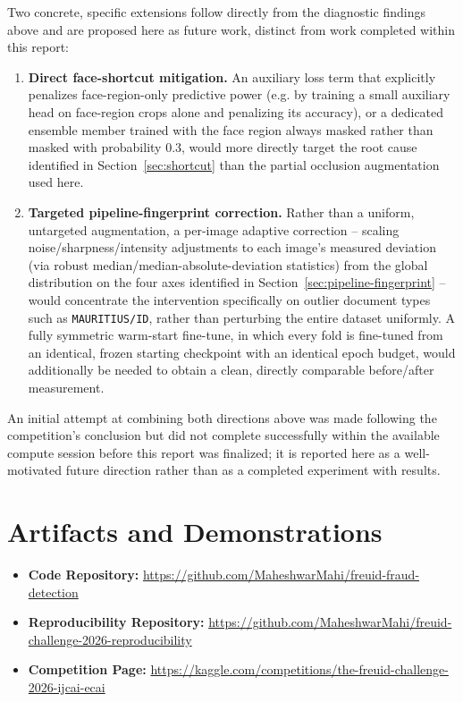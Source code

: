 \documentclass{article}
\begin{document}
Two concrete, specific extensions follow directly from the diagnostic
findings above and are proposed here as future work, distinct from work
completed within this report:
\begin{enumerate}[noitemsep]
    \item \textbf{Direct face-shortcut mitigation.} An auxiliary loss term
    that explicitly penalizes face-region-only predictive power (e.g. by
    training a small auxiliary head on face-region crops alone and
    penalizing its accuracy), or a dedicated ensemble member trained with
    the face region always masked rather than masked with probability 0.3,
    would more directly target the root cause identified in
    Section~\ref{sec:shortcut} than the partial occlusion augmentation used
    here.
    \item \textbf{Targeted pipeline-fingerprint correction.} Rather than a
    uniform, untargeted augmentation, a per-image adaptive correction --
    scaling noise/sharpness/intensity adjustments to each image's measured
    deviation (via robust median/median-absolute-deviation statistics) from
    the global distribution on the four axes identified in
    Section~\ref{sec:pipeline-fingerprint} -- would concentrate the
    intervention specifically on outlier document types such as
    \texttt{MAURITIUS/ID}, rather than perturbing the entire dataset
    uniformly. A fully symmetric warm-start fine-tune, in which every fold
    is fine-tuned from an identical, frozen starting checkpoint with an
    identical epoch budget, would additionally be needed to obtain a clean,
    directly comparable before/after measurement.
\end{enumerate}
An initial attempt at combining both directions above was made following
the competition's conclusion but did not complete successfully within the
available compute session before this report was finalized; it is
reported here as a well-motivated future direction rather than as a
completed experiment with results.

\section{Artifacts and Demonstrations}

\begin{itemize}[noitemsep]
    \item \textbf{Code Repository:} \url{https://github.com/MaheshwarMahi/freuid-fraud-detection}
    \item \textbf{Reproducibility Repository:} \url{https://github.com/MaheshwarMahi/freuid-challenge-2026-reproducibility}
    \item \textbf{Competition Page:} \url{https://kaggle.com/competitions/the-freuid-challenge-2026-ijcai-ecai}
\end{itemize}
\end{document}

